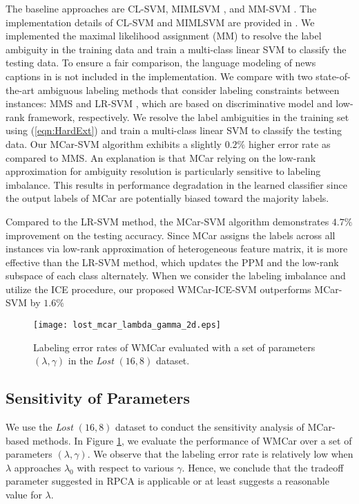 \documentclass[10pt,journal,compsoc]{IEEEtran}
\begin{document}
The baseline approaches are CL-SVM, MIMLSVM \cite{Zhou2006}, and MM-SVM \cite{Berg2004}. The implementation details of CL-SVM and MIMLSVM are provided in \cite{Luo2010}. We implemented the maximal likelihood assignment (MM) \cite{Berg2004} to resolve the label ambiguity in the training data and train a multi-class linear SVM \cite{CC01a} to classify the testing data.
To ensure a fair comparison, the language modeling of news captions in \cite{Berg2004} is not included in the implementation.
 We compare with two state-of-the-art ambiguous labeling methods that consider labeling constraints between instances: MMS \cite{Luo2010} and LR-SVM \cite{Zeng2013}, which are based on discriminative model and low-rank framework, respectively. We resolve the label ambiguities in the training set using (\ref{eqn:HardExt}) and train a multi-class linear SVM \cite{CC01a} to classify the testing data. Our MCar-SVM algorithm exhibits a slightly $0.2\%$ higher error rate as compared to MMS.
An explanation is that MCar relying on the low-rank approximation for ambiguity resolution is particularly sensitive to labeling imbalance. This results in performance degradation in the learned classifier since the output labels of MCar are potentially biased toward the majority labels.



Compared to the LR-SVM method, the MCar-SVM algorithm demonstrates $4.7\%$ improvement on the testing accuracy. Since MCar assigns the labels across all instances via low-rank approximation of heterogeneous feature matrix, it is more effective than the LR-SVM method, which updates the PPM and the low-rank subspace of each class alternately.
When we consider the labeling imbalance and utilize the ICE procedure, our proposed WMCar-ICE-SVM outperforms MCar-SVM by $1.6\%$

\begin{figure}
\centering
\texttt{[image: lost\_mcar\_lambda\_gamma\_2d.eps]}
\caption{Labeling error rates of WMCar evaluated with a set of parameters $(\lambda, \gamma)$ in the \emph{Lost} $(16,8)$ dataset.
}
\label{fig:tune_lambda_gamma}
\end{figure}


\subsection{Sensitivity of Parameters} \label{subsec:parameter_sen}

We use the \emph{Lost} $(16,8)$ dataset to conduct the sensitivity analysis of MCar-based methods. In Figure \ref{fig:tune_lambda_gamma}, we evaluate the performance of WMCar over a set of parameters $(\lambda, \gamma)$. We observe that the labeling error rate is relatively low when $\lambda$ approaches $\lambda_0$ with respect to various $\gamma$. Hence, we conclude that the tradeoff parameter suggested in RPCA is applicable or at least suggests a reasonable value for $\lambda$.
\end{document}
